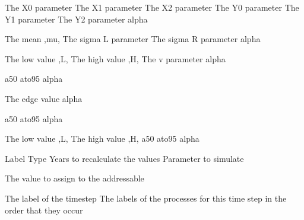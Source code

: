 \par\textbf{}\par
{} {The X0 parameter}
 {The X1 parameter}
 {The X2 parameter}
 {The Y0 parameter}
 {The Y1 parameter}
 {The Y2 parameter}
 {alpha}
\par\textbf{}\par
{} {The mean ,mu,}
 {The sigma L parameter}
 {The sigma R parameter}
 {alpha}
\par\textbf{}\par
{} {The low value ,L,}
 {The high value ,H,}
 {The v parameter}
 {alpha}
\par\textbf{}\par
{} {a50}
 {ato95}
 {alpha}
\par\textbf{}\par
{} {The edge value}
 {alpha}
\par\textbf{}\par
{} {a50}
 {ato95}
 {alpha}
\par\textbf{}\par
{} {The low value ,L,}
 {The high value ,H,}
 {a50}
 {ato95}
 {alpha}
\par\par
{} {Label}
 {Type}
 {Years to recalculate the values}
 {Parameter to simulate}
\par\textbf{}\par
{} {The value to assign to the addressable}
\par\par
{} {The label of the timestep}
 {The labels of the processes for this time step in the order that they occur}
\par\par
